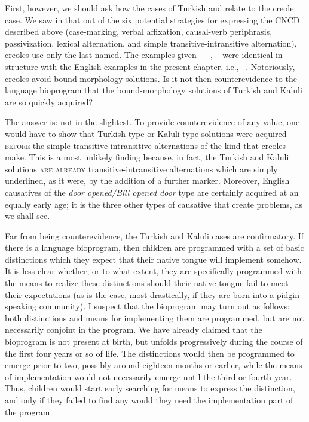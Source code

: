 First, however, we should ask how the cases of Turkish and  relate to the creole case. We saw in  that out of the six potential strategies for expressing the CNCD described above (case-marking, verbal affixation, causal-verb periphrasis, passivization, lexical
alternation, and simple transitive-intransitive alternation), creoles use only the last named. The examples given -- --,  -- were identical in structure with the English examples in the present chapter, i.e., --. Notoriously, creoles avoid bound-mor\-phol\-o\-gy solutions. Is it not then counterevidence to the language bioprogram that the bound-mor\-phol\-o\-gy solutions of Turkish and Kaluli are so quickly acquired?

The answer is: not in the slightest. To provide counterevidence of any value, one would have to show that Turkish-type or Kaluli-type solutions were acquired \textsc{before} the simple transitive-intransitive alternations of the kind that creoles make. This is a most unlikely finding because, in fact, the Turkish and Kaluli solutions \textsc{are already} transitive-intransitive alternations which are simply under\-lined, as it were, by the addition of a further marker. Moreover, English causatives of the \textit{door opened/Bill opened door} type are certainly acquired at an equally early age; it is the three other types of causative that create problems, as we shall see.

\largerpage
Far from being counterevidence, the Turkish and Kaluli cases are confirmatory. If there is a language bioprogram, then children are programmed with a set of basic distinctions which they expect that their native tongue will implement somehow. It is less clear whether, or to what extent, they are specifically programmed with the means to realize these distinctions should their native tongue fail to meet their expectations (as is the case, most drastically, if they are born into a pidgin-speaking community). I suspect that the bioprogram may turn out as follows: both distinctions and means for implementing them are programmed, but are not necessarily conjoint in the program. We have already claimed that the bioprogram is not present at birth, but unfolds progressively during the course of the first four years or so of life. The distinctions would then be programmed to emerge prior to two, possibly around eighteen months or earlier, while the means of implementation would not necessarily emerge until the third or fourth year. Thus, children would start early searching for means to express the distinction, and only if they failed to find any
would they need the implementation part of the program.

